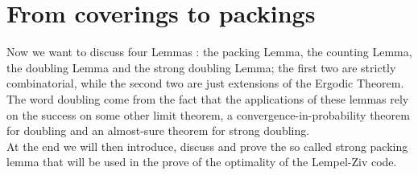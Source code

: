 \section{From coverings to packings}
Now we want to discuss four Lemmas : the packing Lemma, the counting
Lemma, the doubling Lemma and the strong doubling Lemma; the first two are strictly combinatorial, while the second two are just extensions of the Ergodic Theorem.
\\The word doubling come from the fact that the applications of these
lemmas rely on the success on some other limit theorem, a
convergence-in-probability theorem for doubling and an almost-sure theorem for strong doubling. 
\\At the end we will then introduce, discuss and prove the so called strong packing lemma that will be used in the prove of the optimality of the Lempel-Ziv code.

